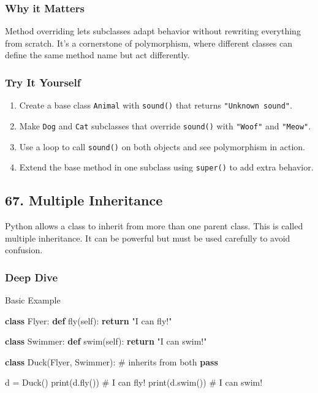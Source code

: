 \documentclass[
  letterpaper,
  DIV=11,
  numbers=noendperiod]{scrreprt}
\newenvironment{Shaded}{\begin{snugshade}}{\end{snugshade}}
\newcommand{\BuiltInTok}[1]{\textcolor[rgb]{0.00,0.23,0.31}{#1}}
\newcommand{\CommentTok}[1]{\textcolor[rgb]{0.37,0.37,0.37}{#1}}
\newcommand{\ControlFlowTok}[1]{\textcolor[rgb]{0.00,0.23,0.31}{\textbf{#1}}}
\newcommand{\KeywordTok}[1]{\textcolor[rgb]{0.00,0.23,0.31}{\textbf{#1}}}
\newcommand{\NormalTok}[1]{\textcolor[rgb]{0.00,0.23,0.31}{#1}}
\newcommand{\OperatorTok}[1]{\textcolor[rgb]{0.37,0.37,0.37}{#1}}
\newcommand{\StringTok}[1]{\textcolor[rgb]{0.13,0.47,0.30}{#1}}
\newcommand{\VariableTok}[1]{\textcolor[rgb]{0.07,0.07,0.07}{#1}}
\providecommand{\tightlist}{%
  \setlength{\itemsep}{0pt}\setlength{\parskip}{0pt}}
\begin{document}
\subsubsection{Why it Matters}\label{why-it-matters-65}

Method overriding lets subclasses adapt behavior without rewriting
everything from scratch. It's a cornerstone of polymorphism, where
different classes can define the same method name but act differently.

\subsubsection{Try It Yourself}\label{try-it-yourself-65}

\begin{enumerate}
\def\labelenumi{\arabic{enumi}.}
\tightlist
\item
  Create a base class \texttt{Animal} with \texttt{sound()} that returns
  \texttt{"Unknown\ sound"}.
\item
  Make \texttt{Dog} and \texttt{Cat} subclasses that override
  \texttt{sound()} with \texttt{"Woof"} and \texttt{"Meow"}.
\item
  Use a loop to call \texttt{sound()} on both objects and see
  polymorphism in action.
\item
  Extend the base method in one subclass using \texttt{super()} to add
  extra behavior.
\end{enumerate}

\subsection{67. Multiple Inheritance}\label{multiple-inheritance}

Python allows a class to inherit from more than one parent class. This
is called multiple inheritance. It can be powerful but must be used
carefully to avoid confusion.

\subsubsection{Deep Dive}\label{deep-dive-66}

Basic Example

\begin{Shaded}
\begin{Highlighting}[]
\KeywordTok{class}\NormalTok{ Flyer:}
    \KeywordTok{def}\NormalTok{ fly(}\VariableTok{self}\NormalTok{):}
        \ControlFlowTok{return} \StringTok{"I can fly!"}

\KeywordTok{class}\NormalTok{ Swimmer:}
    \KeywordTok{def}\NormalTok{ swim(}\VariableTok{self}\NormalTok{):}
        \ControlFlowTok{return} \StringTok{"I can swim!"}

\KeywordTok{class}\NormalTok{ Duck(Flyer, Swimmer):   }\CommentTok{\# inherits from both}
    \ControlFlowTok{pass}

\NormalTok{d }\OperatorTok{=}\NormalTok{ Duck()}
\BuiltInTok{print}\NormalTok{(d.fly())   }\CommentTok{\# I can fly!}
\BuiltInTok{print}\NormalTok{(d.swim())  }\CommentTok{\# I can swim!}
\end{Highlighting}
\end{Shaded}
\end{document}
